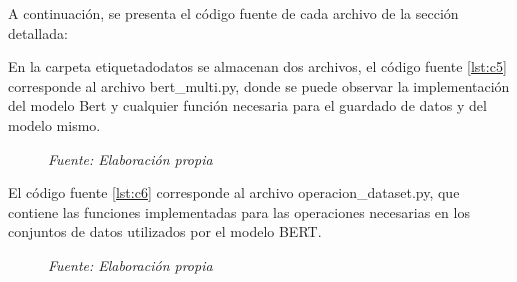 A continuación, se presenta el código fuente de cada archivo de la sección detallada:


En la carpeta etiquetadodatos se almacenan dos archivos, el código fuente \ref{lst:c5} corresponde al archivo bert\_multi.py, donde se puede observar la implementación del modelo Bert y cualquier función necesaria para el guardado de datos y del modelo mismo.


\vspace{-1.3em} %

\begin{figure}[h!]
	\centering %
	\textit{Fuente: Elaboración propia}
\end{figure}

El código fuente \ref{lst:c6} corresponde al archivo operacion\_dataset.py, que contiene las funciones implementadas para las operaciones necesarias en los conjuntos de datos utilizados por el modelo BERT.



\vspace{-1.3em} %

\begin{figure}[h!]
	\centering %
	\textit{Fuente: Elaboración propia}
\end{figure}
